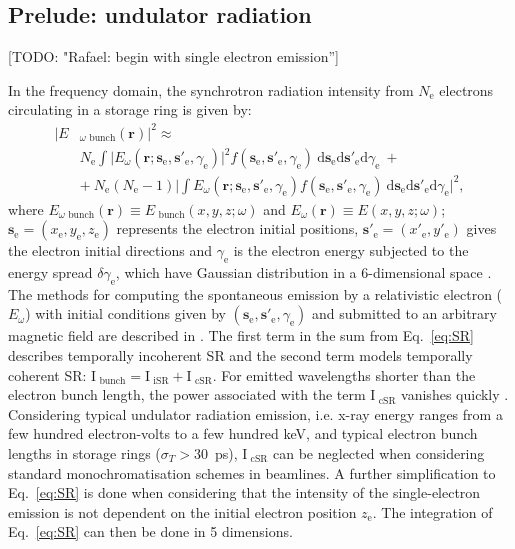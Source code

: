 \documentclass{iucr}              %
\newcommand{\todo}[1]{{\color{red}[TODO: "#1'']}}
\begin{document}
\subsection{Prelude: undulator radiation}

\todo{Rafael: begin with single electron emission}

In the frequency domain, the synchrotron radiation intensity from $N_\text{e}$ electrons circulating in a storage ring is given by: 
\begin{equation}
\begin{split}
|E&_{\omega\text{~bunch}}(\textbf{r})|^2 \approx \\
 &N_\text{e} \int\big| E_\omega(\textbf{r};\textbf{s}_\text{e}, \textbf{s}'_\text{e}, \gamma_\text{e})\big|^2 f(\textbf{s}_\text{e}, \textbf{s}'_\text{e}, \gamma_\text{e})~ \text{d}\textbf{s}_\text{e} \text{d}\textbf{s}'_\text{e} \text{d}\gamma_\text{e}~+\\
&+~ N_\text{e}(N_\text{e}-1)\bigg| \int E_\omega(\textbf{r};\textbf{s}_\text{e}, \textbf{s}'_\text{e}, \gamma_\text{e}) f(\textbf{s}_\text{e}, \textbf{s}'_\text{e}, \gamma_\text{e})~ \text{d}\textbf{s}_\text{e} \text{d}\textbf{s}'_\text{e} \text{d}\gamma_\text{e} \bigg|^2,
\end{split}
\label{eq:SR}
\end{equation}
where $E_{\omega\text{~bunch}}(\textbf{r})\equiv E_{\text{~bunch}}(x,y, z;\omega)$ and $E_\omega(\textbf{r})\equiv E(x,y, z;\omega)$; $\textbf{s}_\text{e}=(x_\text{e},y_\text{e},z_\text{e})$ represents the electron initial positions, $\textbf{s}'_\text{e}=(x'_\text{e},y'_\text{e})$ gives the electron initial directions and $\gamma_\text{e}$ is the electron energy subjected to the energy spread $\delta \gamma_\text{e}$, which have Gaussian distribution in a 6-dimensional space \cite{codeSRW_CSR}. The methods for computing the spontaneous emission by a relativistic electron ($E_\omega$) with initial conditions given by $(\textbf{s}_\text{e}, \textbf{s}'_\text{e},\gamma_\text{e})$ and submitted to an arbitrary magnetic field are described in \cite{Chubar1995,codeSRW}. The first term in the sum from Eq.~\ref{eq:SR} describes temporally incoherent SR and the second term models temporally coherent SR: $\text{I}_\text{~bunch} = \text{I}_\text{~iSR}+\text{I}_\text{~cSR}$. For emitted wavelengths shorter than the electron bunch length, the power associated with the term $\text{I}_\text{~cSR}$ vanishes quickly \cite{Wiedemann2015}.
Considering typical undulator radiation emission, i.e. x-ray energy ranges from a few hundred electron-volts to a few hundred keV, and typical electron bunch lengths in storage rings ($\sigma_{T}>30$~ps), $\text{I}_\text{~cSR}$ can be neglected when considering standard monochromatisation schemes in beamlines. A further simplification to Eq.~\ref{eq:SR} is done when considering that the intensity of the single-electron emission is not dependent on the initial electron position $z_\text{e}$. The integration of Eq.~\ref{eq:SR} can then be done in 5 dimensions.
\end{document}
